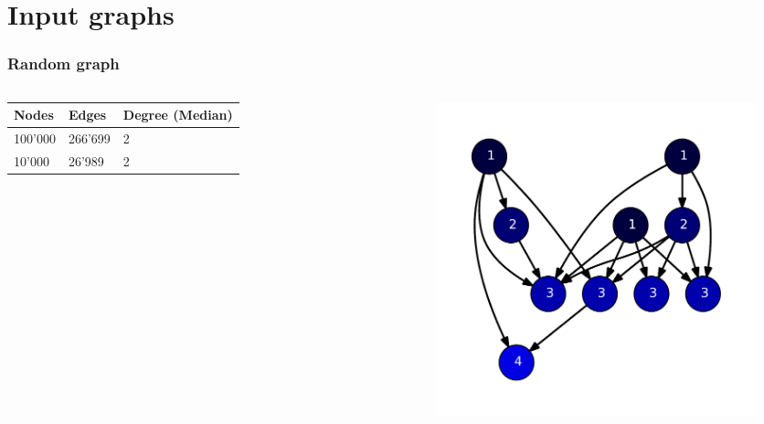 \section{Input graphs}
\begin{frame}
\frametitle{Random graph}
\begin{columns}[c]
 \begin{tabular}{p{1cm}p{1cm}p{1.5cm}}
  Nodes    & Edges   & Degree (Median)\\\hline
  100'000  & 266'699 & 2\\
  10'000   & 26'989 & 2
 \end{tabular}
 \begin{figure}[!hbp]
    \includegraphics[height=0.7\textheight]{img/random_lin10.pdf}
 \end{figure}
\end{columns}

\end{frame}

